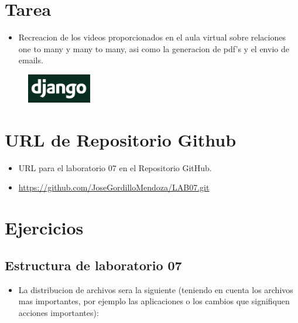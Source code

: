 \documentclass{article}
\begin{document}
	\section{Tarea}
	\begin{itemize}		
		\item Recreacion de los videos proporcionados en el aula virtual sobre relaciones one to many y many to many, asi como la generacion de pdf's y el envio de emails.
	\end{itemize}
        \begin{figure}[H]
		\centering
		\includegraphics[width=0.25\textwidth,keepaspectratio]{img/django.png}
	\end{figure}

	\section{URL de Repositorio Github}
	\begin{itemize}
		\item URL para el laboratorio 07 en el Repositorio GitHub.
		\item \url{https://github.com/JoseGordilloMendoza/LAB07.git}
	\end{itemize}
	
	\section{Ejercicios}
 
        \subsection{Estructura de laboratorio 07}
	\begin{itemize}	
		\item La distribucion de archivos sera la siguiente (teniendo en cuenta los archivos mas importantes, por ejemplo las aplicaciones o los cambios que signifiquen acciones importantes):
	\end{itemize}
	
\end{document}
